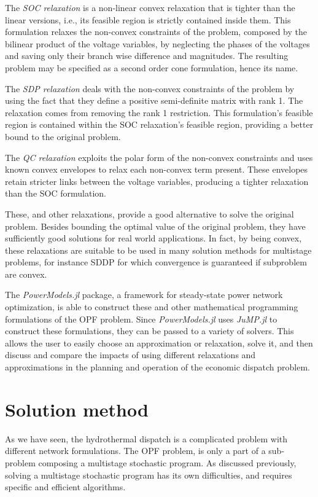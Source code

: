 \documentclass{juliacon}
\begin{document}
The \textit{SOC relaxation} is a non-linear convex relaxation that is tighter than the linear versions, i.e., its feasible region is strictly contained inside them. This formulation relaxes the non-convex constraints of the problem, composed by the bilinear product of the voltage variables, by neglecting the phases of the voltages and saving only their branch wise difference and magnitudes. The resulting problem may be specified as a second order cone formulation, hence its name.

The \textit{SDP relaxation} deals with the non-convex constraints of the problem by using the fact that they define a positive semi-definite matrix with rank 1. The relaxation comes from removing the rank 1 restriction. This formulation's feasible region is contained within the SOC relaxation's feasible region, providing a better bound to the original problem. 

The \textit{QC relaxation} exploits the polar form of the non-convex constraints and uses known convex envelopes to relax each non-convex term present. These envelopes retain stricter links between the voltage variables, producing a tighter relaxation than the SOC formulation.

These, and other relaxations, provide a good alternative to solve the original problem. Besides bounding the optimal value of the original problem, they have sufficiently good solutions for real world applications.
In fact, by being convex, these relaxations are suitable to be used in many solution methods for multistage problems, for instance SDDP for which convergence is guaranteed if subproblem are convex.

The \textit{PowerModels.jl} package, a framework for steady-state power network optimization, is able to construct these and other mathematical programming formulations of the OPF problem. Since \textit{PowerModels.jl} uses \textit{JuMP.jl} to construct these formulations, they can be passed to a variety of solvers. This allows the user to easily choose an approximation or relaxation, solve it, and then discuss and compare the impacts of using different relaxations and approximations in the planning and operation of the economic dispatch problem.

\section{Solution method}
\label{sec:sddp}

As we have seen, the hydrothermal dispatch is a complicated problem with different network formulations. The OPF problem, is only a part of a sub-problem composing a multistage stochastic program. As discussed previously, solving a multistage stochastic program has its own difficulties, and requires specific and efficient algorithms.
\end{document}

